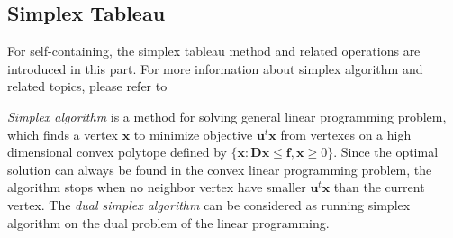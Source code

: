 \documentclass[letterpaper]{article}
\begin{document}
\subsection{Simplex Tableau}
For self-containing, the simplex tableau method and related operations are introduced in this part. For more information about simplex algorithm and related topics, please refer to \cite{Schrijver:1986:TLI:17634}

\emph{Simplex algorithm} is a method for solving general linear programming problem,
which finds a vertex $\mathbf{x}$ to minimize objective $\mathbf{u}^t\mathbf{x}$ from vertexes on a high dimensional convex polytope defined by $\{\mathbf{x} : \mathbf{D}\mathbf{x} \leq \mathbf{f}, \mathbf{x} \geq 0\}$.
Since the optimal solution can always be found in the convex linear programming problem, the algorithm stops when no neighbor vertex have smaller $\mathbf{u}^t\mathbf{x}$ than the current vertex. The \emph{dual simplex algorithm}  can be considered as running simplex algorithm on the dual problem of the linear programming.
\end{document}
